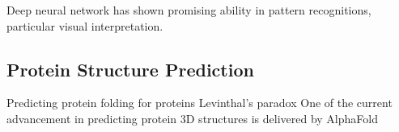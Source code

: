 Deep neural network has shown promising ability in pattern recognitions, particular visual interpretation.
\par 

\subsection{Protein Structure Prediction}
Predicting protein folding for  proteins  Levinthal's paradox One of the current advancement in predicting protein 3D structures is delivered by AlphaFold